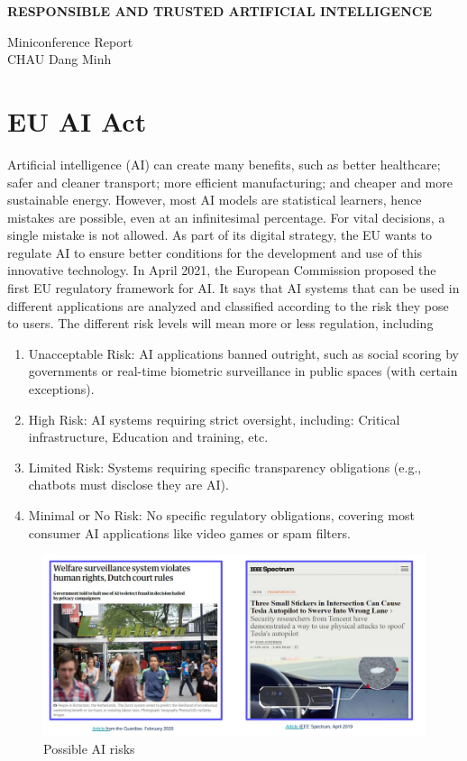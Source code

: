 \begin{center}
    \textbf{\Large RESPONSIBLE AND TRUSTED ARTIFICIAL INTELLIGENCE} \\
    \vspace{0.5cm}

    Miniconference Report \\
    CHAU Dang Minh
\end{center}

\section{EU AI Act}

Artificial intelligence (AI) can create many benefits, such as better healthcare; safer and cleaner transport; more efficient manufacturing; and cheaper and more sustainable energy. However, most AI models are statistical learners, hence mistakes are possible, even at an infinitesimal percentage. For vital decisions, a single mistake is not allowed. As part of its digital strategy, the EU wants to regulate AI to ensure better conditions for the development and use of this innovative technology. In April 2021, the European Commission proposed the first EU regulatory framework for AI. It says that AI systems that can be used in different applications are analyzed and classified according to the risk they pose to users. The different risk levels will mean more or less regulation, including

\begin{enumerate}
    \item Unacceptable Risk: AI applications banned outright, such as social scoring by governments or real-time biometric surveillance in public spaces (with certain exceptions).
    \item High Risk: AI systems requiring strict oversight, including: Critical infrastructure, Education and training, etc.
    \item Limited Risk: Systems requiring specific transparency obligations (e.g., chatbots must disclose they are AI).
    \item Minimal or No Risk: No specific regulatory obligations, covering most consumer AI applications like video games or spam filters.
\end{enumerate}

\begin{figure}[ht]
    \centering
    \includegraphics[width=\textwidth]{img/risks.png}
    \caption{Possible AI risks}
\end{figure}


